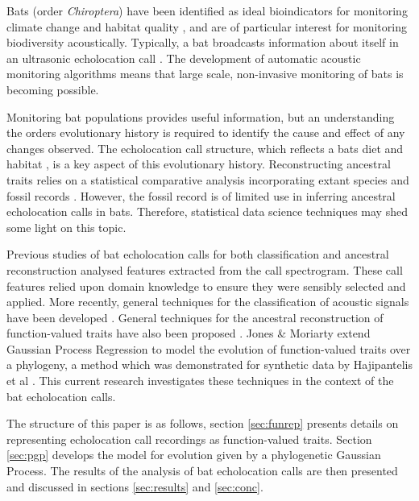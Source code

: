 \documentclass{ws-rv9x6}
\begin{document}
Bats (order \textit{Chiroptera}) have been identified as ideal bioindicators for monitoring climate change and habitat quality \cite{jones2009carpe}, and are of particular interest for monitoring biodiversity acoustically. Typically, a bat broadcasts information about itself in an ultrasonic echolocation call \cite{griffin1944echolocation}. The development of automatic acoustic monitoring algorithms \cite{stathopoulos2017bat} \cite{walters2012continental} means that large scale, non-invasive monitoring of bats is becoming possible.   

Monitoring bat populations provides useful information, but an understanding the orders evolutionary history is required to identify the cause and effect of any changes observed. The echolocation call structure, which reflects a bats diet and habitat \cite{aldridge1987morphology}, is a key aspect of this evolutionary history. Reconstructing ancestral traits \cite{joy2016ancestral} relies on a statistical comparative analysis incorporating extant species and fossil records \cite{felsenstein2004inferring}. However, the fossil record is of limited use in inferring ancestral echolocation calls in bats. Therefore, statistical data science techniques may shed some light on this topic.

Previous studies of bat echolocation calls for both classification \cite{walters2012continental} and ancestral reconstruction \cite{collen2012evolution} analysed features extracted from the call spectrogram. These call features relied upon domain knowledge to ensure they were sensibly selected and applied. More recently, general techniques for the classification of acoustic signals have been developed \cite{stathopoulos2014bat} \cite{damoulas2010bayesian}. General techniques for the ancestral reconstruction of function-valued traits have also been proposed \cite{group2012phylogenetic}. Jones \& Moriarty \cite{jones2013evolutionary} extend Gaussian Process Regression \cite{rasmussen2006gaussian} to model the evolution of function-valued traits \cite{meyer2005up} over a phylogeny, a method which was demonstrated for synthetic data by Hajipantelis et al \cite{hadjipantelis2013function}. This current research investigates these techniques in the context of the bat echolocation calls.

The structure of this paper is as follows, section \ref{sec:funrep} presents details on representing echolocation call recordings as function-valued traits. Section \ref{sec:pgp} develops the model for evolution given by a phylogenetic Gaussian Process. The results of the analysis of bat echolocation calls are then presented and discussed in sections \ref{sec:results} and \ref{sec:conc}.
\end{document}
